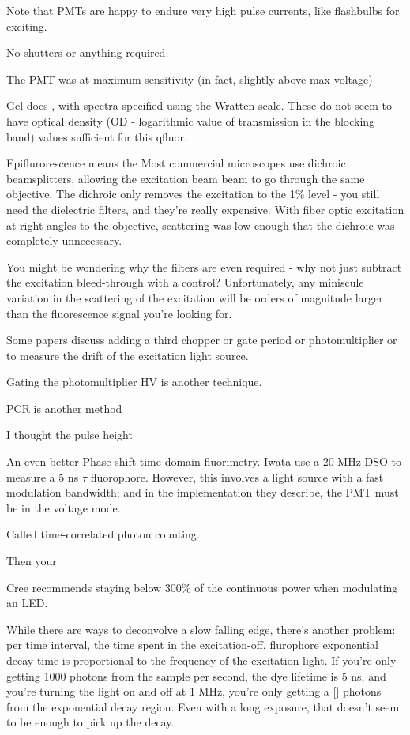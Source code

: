 \documentclass[paper.tex]{subfiles}
\begin{document}
Note that PMTs are happy to endure very high pulse currents, like flashbulbs for exciting. 


No shutters or anything required. 


The PMT was at maximum sensitivity (in fact, slightly above max voltage)

Gel-docs , with spectra specified using the Wratten scale. These do not seem to have optical density (OD - logarithmic value of transmission in the blocking band) values sufficient for this qfluor. 

Epiflurorescence means the Most commercial microscopes use dichroic beamsplitters, allowing the excitation beam beam to go through the same objective. The dichroic only removes the excitation to the 1\% level - you still need the dielectric filters, and they’re really expensive. With fiber optic excitation at right angles to the objective, scattering was low enough that the dichroic was completely unnecessary. 

You might be wondering why the filters are even required - why not just subtract the excitation bleed-through with a control? Unfortunately, any miniscule variation in the scattering of the excitation will be orders of magnitude larger than the fluorescence signal you’re looking for.

Some papers discuss adding a third chopper or gate period or photomultiplier or to measure the drift of the excitation light source.

Gating the photomultiplier HV is another technique.

PCR is another method




I thought the pulse height

An even better Phase-shift time domain fluorimetry. Iwata use a 20 MHz DSO to measure a 5 ns $\tau$ fluorophore. However, this involves a light source with a fast modulation bandwidth; and in the implementation they describe, the PMT must be in the voltage mode.

Called time-correlated photon counting.

Then your 

Cree recommends staying below 300\% of the continuous power when modulating an LED.

While there are ways to deconvolve a slow falling edge, there’s another problem: per time interval, the time spent in the excitation-off, flurophore exponential decay time is proportional to the frequency of the excitation light. If you’re only getting 1000 photons from the sample per second, the dye lifetime is 5 ns, and you’re turning the light on and off at 1 MHz, you’re only getting a [] photons from the exponential decay region. Even with a long exposure, that doesn’t seem to be enough to pick up the decay. 
\end{document}
